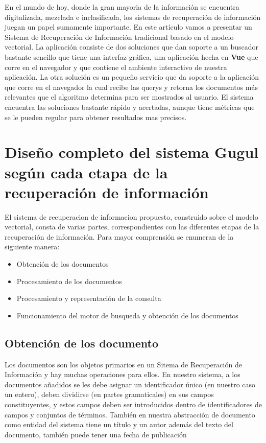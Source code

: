 \documentclass{llncs}
\begin{document}
	En el mundo de hoy, donde la gran mayoria de la informaci\'on se encuentra digitalizada, mezclada e inclasificada, los sistemas de recuperaci\'on de informaci\'on juegan un papel sumamente importante.
	En este art\'iculo vamos a presentar un Sistema de Recuperaci\'on de Informaci\'on tradicional basado en el modelo vectorial. La aplicaci\'on consiste de dos soluciones que dan soporte a un buscador bastante sencillo que tiene una interfaz gr\'afica, una aplicaci\'on hecha en \textbf{Vue} que corre en el navegador y que contiene el ambiente interactivo de nuestra aplicaci\'on. La otra soluci\'on es un peque\~no servicio que da soporte a la aplicaci\'on que corre en el navegador la cual recibe las querys y retorna los documentos m\'as relevantes que el algoritmo determina para ser mostrados al usuario. El sistema encuentra las soluciones bastante r\'apido y acertadas, aunque tiene m\'etricas que se le pueden regular para obtener resultados mas precisos.
	
	
	\newpage
	
	
	\section{Dise\~no completo del sistema Gugul seg\'un cada etapa de la recuperaci\'on de informaci\'on}
	
	El sistema de recuperacion de informacion propuesto, construido sobre el modelo vectorial, consta de varias partes, correspondientes con las diferentes etapas de la recuperaci\'on de informaci\'on. Para mayor comprensi\'on se enumeran de la siguiente manera:
	
	\begin{itemize}
		\item Obtenci\'on de los documentos 
		\item Procesamiento de los documentos 
		\item Procesamiento y representaci\'on de la consulta 
		\item Funcionamiento del motor de busqueda y obtenci\'on de los documentos 
	\end{itemize}
	
	\subsection{Obtenci\'on de los documento}
	
	
	Los documentos son los objetos primarios en un Sitema de Recuperaci\'on de Informaci\'on y hay muchas operaciones para ellos. En nuestro sistema, a los documentos a\~nadidos  se les debe asignar un identificador \'unico (en nuestro caso un entero), deben dividirse (en partes gramaticales) en sus campos constituyentes, y estos campos deben ser introducidos dentro de identificadores de campos y conjuntos de t\'erminos. Tambi\'en en nuestra abstracci\'on de documento como entidad del sistema tiene un t\'itulo y un autor adem\'as del texto del documento, tambi\'en puede tener una fecha de publicaci\'on
	
\end{document}
